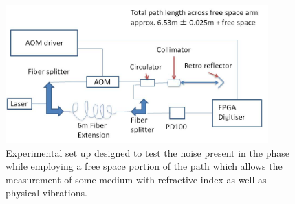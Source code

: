 \documentclass[12pt,a4paper,oneside]{report}
\begin{document}
\begin{figure}[H] 
\includegraphics[width=0.9\textwidth, center,angle=0]{DImages/intconfig2.JPG}
\caption{Experimental set up designed to test the noise present in the phase while employing a free space portion of the path which allows the measurement of some medium with refractive index as well as physical vibrations.}
\label{fig:intconfig2}
\end{figure}
\end{document}
